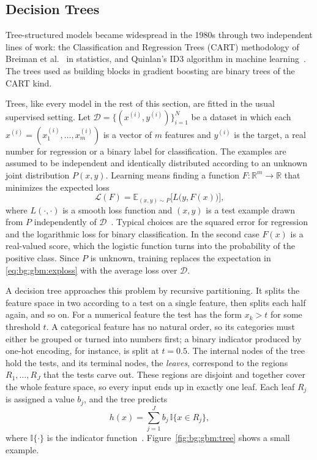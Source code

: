 \subsection{Decision Trees}
    \label{subsec:bg:gbm:trees}
    Tree-structured models became widespread
    in the 1980s through two independent lines of work: the Classification and
    Regression Trees (CART) methodology of Breiman et al.~\cite{breiman1984} in
    statistics, and Quinlan's ID3 algorithm in machine learning~\cite{quinlan1986}.
    The trees used as building blocks in gradient boosting are binary trees of the
    CART kind.
    
    Trees, like every model in the rest of this section, are fitted in the usual
    supervised setting. Let
    $\mathcal{D} = \{(x^{(i)}, y^{(i)})\}_{i=1}^{N}$ be a dataset in which each
    $x^{(i)} = (x^{(i)}_1, \dots, x^{(i)}_m)$ is a vector of $m$ features and
    $y^{(i)}$ is the target, a real number for regression or a binary label for
    classification. The examples are assumed to be independent and identically
    distributed according to an unknown joint distribution $P(x, y)$. Learning
    means finding a function $F \colon \mathbb{R}^m \to \mathbb{R}$ that minimizes
    the expected loss
    \begin{equation}
    \mathcal{L}(F) = \mathbb{E}_{(x, y) \sim P}\bigl[ L\bigl(y, F(x)\bigr) \bigr],
    \label{eq:bg:gbm:exploss}
    \end{equation}
    where $L(\cdot, \cdot)$ is a smooth loss function and $(x, y)$ is a test
    example drawn from $P$ independently of $\mathcal{D}$~\cite{prokhorenkova2018}.
    Typical choices are the squared error for regression and the logarithmic loss
    for binary classification. In the second case $F(x)$ is a real-valued score,
    which the logistic function turns into the probability of the positive class.
    Since $P$ is unknown, training replaces the expectation in
    \eqref{eq:bg:gbm:exploss} with the average loss over $\mathcal{D}$.
    
    A decision tree approaches this problem by recursive partitioning. It splits
    the feature space in two according to a test on a single feature, then splits
    each half again, and so on. For a numerical feature the test has the form
    $x_k > t$ for some threshold $t$. A categorical feature has no natural order,
    so its categories must either be grouped or turned into numbers first; a
    binary indicator produced by one-hot encoding, for instance, is split at
    $t = 0.5$. The internal nodes of the tree hold the
    tests, and its terminal nodes, the \emph{leaves}, correspond to the regions
    $R_1, \dots, R_J$ that the tests carve out. These regions are disjoint and
    together cover the whole feature space, so every input ends up in exactly one
    leaf. Each leaf $R_j$ is assigned a value $b_j$, and the tree predicts
    \begin{equation}
    h(x) = \sum_{j=1}^{J} b_j \, \mathbb{I}{\{x \in R_j\}},
    \label{eq:bg:gbm:tree}
    \end{equation}
    where $\mathbb{I}\{\cdot\}$ is the indicator function~\cite{friedman2001}.
    Figure~\ref{fig:bg:gbm:tree} shows a small example.
    
